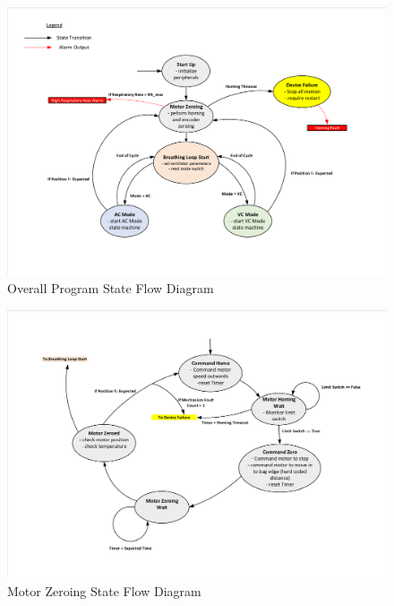\documentclass[]{article}
\begin{document}
\begin{appendices}
\begin{figure}
	\includegraphics[scale=0.8, trim = 6 6 6 6, clip]{figures/main_state_flow_deprecated.pdf}
	\caption{Overall Program State Flow Diagram}
	\label{fig:main_dstfd}
\end{figure}

\begin{figure}
	\includegraphics[scale=0.8, trim = 6 6 6 6, clip]{figures/motor_zeroing_deprecated.pdf}
	\caption{Motor Zeroing State Flow Diagram}
	\label{fig:mz_dstfd}
\end{figure}


\end{appendices}
\end{document}
